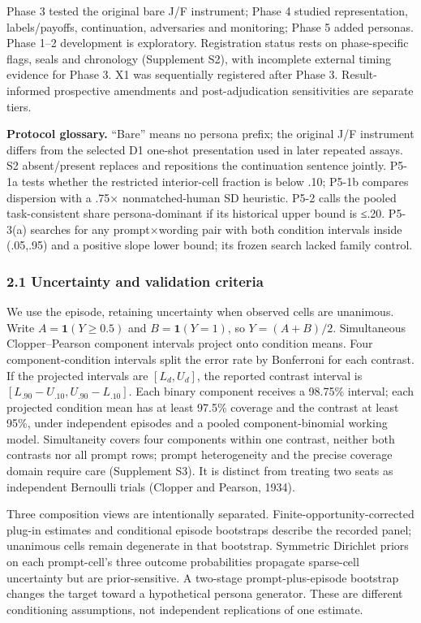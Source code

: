 \documentclass[11pt]{article}
\begin{document}
Phase 3 tested the original bare J/F instrument; Phase 4 studied
representation, labels/payoffs, continuation, adversaries and
monitoring; Phase 5 added personas. Phase 1--2 development is
exploratory. Registration status rests on phase-specific flags, seals
and chronology (Supplement S2), with incomplete external timing evidence
for Phase 3. X1 was sequentially registered after Phase 3.
Result-informed prospective amendments and post-adjudication
sensitivities are separate tiers.

\textbf{Protocol glossary.} ``Bare'' means no persona prefix; the
original J/F instrument differs from the selected D1 one-shot
presentation used in later repeated assays. S2 absent/present replaces
and repositions the continuation sentence jointly. P5-1a tests whether
the restricted interior-cell fraction is below .10; P5-1b compares
dispersion with a .75× nonmatched-human SD heuristic. P5-2 calls the
pooled task-consistent share persona-dominant if its historical upper
bound is ≤.20. P5-3(a) searches for any prompt×wording pair with both
condition intervals inside (.05,.95) and a positive slope lower bound;
its frozen search lacked family control.

\subsubsection{2.1 Uncertainty and validation
criteria}\label{uncertainty-and-validation-criteria}

We use the episode, retaining uncertainty when observed cells are
unanimous. Write \(A=\mathbf 1(Y\ge0.5)\) and \(B=\mathbf 1(Y=1)\), so
\(Y=(A+B)/2\). Simultaneous Clopper--Pearson component intervals project
onto condition means. Four component-condition intervals split the error
rate by Bonferroni for each contrast. If the projected intervals are
\([L_d,U_d]\), the reported contrast interval is
\([L_{.90}-U_{.10},U_{.90}-L_{.10}]\). Each binary component receives a
98.75\% interval; each projected condition mean has at least 97.5\%
coverage and the contrast at least 95\%, under independent episodes and
a pooled component-binomial working model. Simultaneity covers four
components within one contrast, neither both contrasts nor all prompt
rows; prompt heterogeneity and the precise coverage domain require care
(Supplement S3). It is distinct from treating two seats as independent
Bernoulli trials (Clopper and Pearson, 1934).

Three composition views are intentionally separated.
Finite-opportunity-corrected plug-in estimates and conditional episode
bootstraps describe the recorded panel; unanimous cells remain
degenerate in that bootstrap. Symmetric Dirichlet priors on each
prompt-cell's three outcome probabilities propagate sparse-cell
uncertainty but are prior-sensitive. A two-stage prompt-plus-episode
bootstrap changes the target toward a hypothetical persona generator.
These are different conditioning assumptions, not independent
replications of one estimate.
\end{document}
